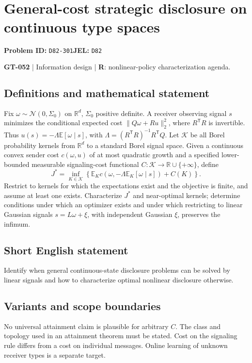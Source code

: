 \documentclass[11pt,a4paper]{article}
\begin{document}
\section*{General-cost strategic disclosure on continuous type spaces}
\textbf{Problem ID:} \texttt{D82-301}\quad \textbf{JEL:} \texttt{D82}\par
\label{problem:OP-0182}
\label{game:GT-052}
{\sffamily\small\color{muted}
\textbf{GT-052} | Information design | \textbf{R}: nonlinear-policy characterization agenda.
\par}
\subsection*{Definitions and mathematical statement}
Fix $\omega\sim\mathcal N(0,\Sigma_0)$ on $\mathbb R^d$, $\Sigma_0$ positive definite. A receiver observing signal $s$ minimizes the conditional expected cost $\|Q\omega+Ru\|_2^2$, where $R^{\mathsf T}R$ is invertible. Thus $u(s)=-\Lambda\mathbb E[\omega\mid s]$, with $\Lambda=(R^{\mathsf T}R)^{-1}R^{\mathsf T}Q$. Let $\mathcal K$ be all Borel probability kernels from $\mathbb R^d$ to a standard Borel signal space. Given a continuous convex sender cost $c(\omega,u)$ of at most quadratic growth and a specified lower-bounded measurable signaling-cost functional $C:\mathcal K\to\mathbb R\cup\{+\infty\}$, define
\[
 J^*=\inf_{K\in\mathcal K}\left\{
 \mathbb E_K c(\omega,-\Lambda\mathbb E_K[\omega\mid s])+C(K)\right\}.
\]
Restrict to kernels for which the expectations exist and the objective is finite, and assume at least one exists. Characterize $J^*$ and near-optimal kernels; determine conditions under which an optimizer exists and under which restricting to linear Gaussian signals $s=L\omega+\xi$, with independent Gaussian $\xi$, preserves the infimum.
\subsection*{Short English statement}
Identify when general continuous-state disclosure problems can be solved by linear signals and how to characterize optimal nonlinear disclosure otherwise.
\subsection*{Variants and scope boundaries}
No universal attainment claim is plausible for arbitrary $C$. The class and topology used in an attainment theorem must be stated. Cost on the signaling rule differs from a cost on individual messages. Online learning of unknown receiver types is a separate target.
\end{document}
